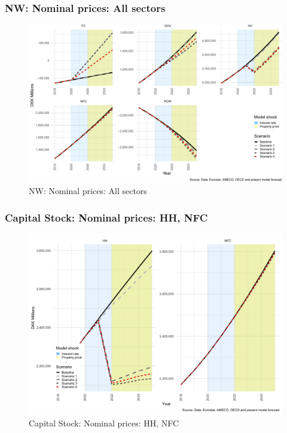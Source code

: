 \documentclass[
]{book}
\begin{document}
\hypertarget{nw-nominal-prices-all-sectors}{%
\subsubsection{NW: Nominal prices: All sectors}\label{nw-nominal-prices-all-sectors}}

\begin{figure}
\centering
\includegraphics{figures/fl-fi-sfc-plot-fnw-1.pdf}
\caption{\label{fig:fl-fi-sfc-plot-fnw}NW: Nominal prices: All sectors}
\end{figure}

\hypertarget{capital-stock-nominal-prices-hh-nfc}{%
\subsubsection{Capital Stock: Nominal prices: HH, NFC}\label{capital-stock-nominal-prices-hh-nfc}}

\begin{figure}[H]
\includegraphics[width=0.95\linewidth]{figures/fl-fi-sfc-plot-k-1} \caption{Capital Stock: Nominal prices: HH, NFC}\label{fig:fl-fi-sfc-plot-k}
\end{figure}
\end{document}

